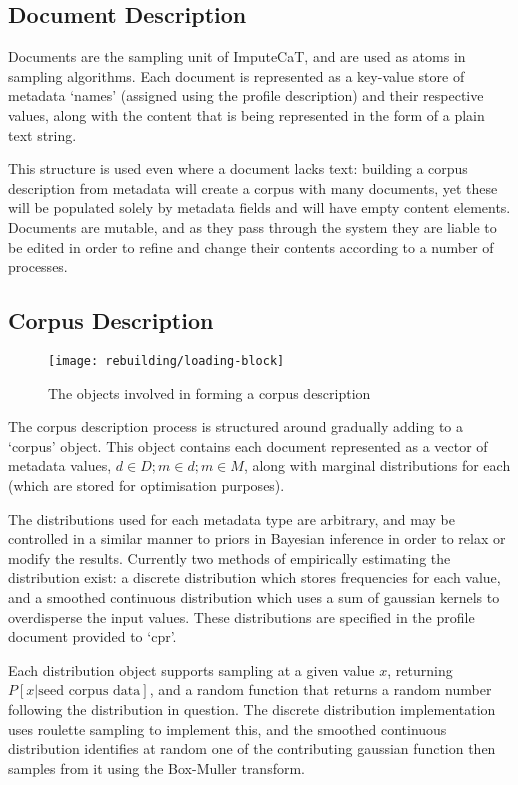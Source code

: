 \subsection{Document Description}
Documents are the sampling unit of ImputeCaT, and are used as atoms in sampling algorithms.  Each document is represented as a key-value store of metadata `names' (assigned using the profile description) and their respective values, along with the content that is being represented in the form of a plain text string.

This structure is used even where a document lacks text: building a corpus description from metadata will create a corpus with many documents, yet these will be populated solely by metadata fields and will have empty content elements.  Documents are mutable, and as they pass through the system they are liable to be edited in order to refine and change their contents according to a number of processes.




\subsection{Corpus Description}


\begin{figure}[h]
    \centering
    \texttt{[image: rebuilding/loading-block]}
    \caption{The objects involved in forming a corpus description}
    \label{fig:rebuilding:loading-block}
\end{figure}


The corpus description process is structured around gradually adding to a `corpus' object.  This object contains each document represented as a vector of metadata values, $d \in D; m \in d; m \in M$, along with marginal distributions for each (which are stored for optimisation purposes).


The distributions used for each metadata type are arbitrary, and may be controlled in a similar manner to priors in Bayesian inference in order to relax or modify the results.  Currently two methods of empirically estimating the distribution exist: a discrete distribution which stores frequencies for each value, and a smoothed continuous distribution which uses a sum of gaussian kernels to overdisperse the input values.  These distributions are specified in the profile document provided to `cpr'.

Each distribution object supports sampling at a given value $x$, returning $P[x | \text{seed corpus data}]$, and a random function that returns a random number following the distribution in question.  The discrete distribution implementation uses roulette sampling to implement this, and the smoothed continuous distribution identifies at random one of the contributing gaussian function then samples from it using the Box-Muller transform.

